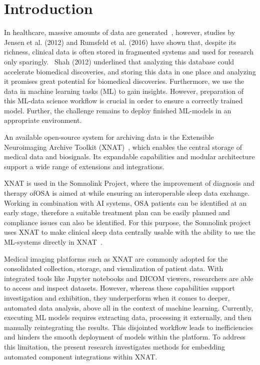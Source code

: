
\chapter{Introduction}



In healthcare, massive amounts of data are generated~\cite{shilo_axes_2020}, however, studies by Jensen et al. (2012) and Rumsfeld et al. (2016) have shown that, despite its richness, clinical data is often stored in fragmented systems and used for research only sparingly.~\cite{jensen_mining_2012} \cite{rumsfeld_big_2016} Shah (2012) underlined that analyzing this database could accelerate biomedical discoveries\cite{shah_coming_2012}, and storing this data in one place and analyzing it promises great potential for biomedical discoveries. Furthermore, we use the data in machine learning tasks (\ac{ML}) to gain insights. However, preparation of this ML-data science workflow is crucial in order to ensure a correctly trained model. Further, the challenge remains to deploy finished ML-models in an appropriate environment.

An available open-source system for archiving data is the Extensible Neuroimaging Archive Toolkit (XNAT)~\cite{marcus_extensible_2007}, which enables the central storage of medical data and biosignals. Its expandable capabilities and modular architecture support a wide range of extensions and integrations.

XNAT is used in the Somnolink Project, where the improvement of diagnosis and therapy of\ac{OSA} is aimed at while ensuring an interoperable sleep data exchange. Working in combination with \ac{AI} systems, OSA patients can be identified at an early stage, therefore a suitable treatment plan can be easily planned and compliance issues can also be identified. For this purpose, the Somnolink project uses XNAT to make clinical sleep data centrally usable with the ability to use the ML-systems directly in XNAT~\cite{internetredaktion_somnolink_nodate}.

Medical imaging platforms such as XNAT are commonly adopted for the consolidated collection, storage, and visualization of patient data. With integrated tools like Jupyter notebooks and \ac{DICOM} viewers, researchers are able to access and inspect datasets. However, whereas these capabilities support investigation and exhibition, they underperform when it comes to deeper, automated data analysis, above all in the context of machine learning. Currently, executing ML models requires extracting data, processing it externally, and then manually reintegrating the results. This disjointed workflow leads to inefficiencies and hinders the smooth deployment of models within the platform. To address this limitation, the present research investigates methods for embedding automated component integrations within XNAT.

